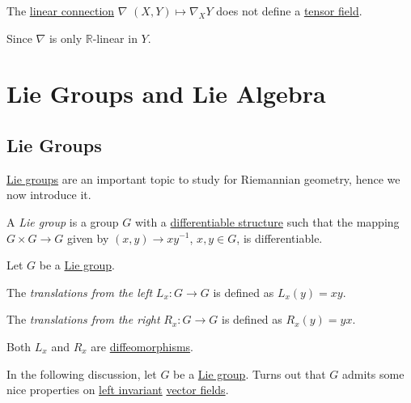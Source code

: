 \begin{eg}
	The \hyperref[def:linear-connection]{linear connection} \(\nabla \) \((X, Y) \mapsto \nabla _X Y\) does not define a \hyperref[def:tensor-field*]{tensor field}.
\end{eg}
\begin{explanation}
	Since \(\nabla \) is only \(\mathbb{R} \)-linear in \(Y\).
\end{explanation}

\section{Lie Groups and Lie Algebra}\label{section:Lie-group-and-Lie-algebra}
\subsection{Lie Groups}
\hyperref[def:Lie-group]{Lie groups} are an important topic to study for Riemannian geometry, hence we now introduce it.

\begin{definition}\label{def:Lie-group}
	A \emph{Lie group} is a group \(G\) with a \hyperref[def:smooth-structure]{differentiable structure} such that the mapping \(G \times G \to G\) given by \((x, y) \to xy^{-1} \), \(x, y\in G\), is differentiable.
\end{definition}

\begin{definition*}[Transformation]
	Let \(G\) be a \hyperref[def:Lie-group]{Lie group}.
	\begin{definition}\label{def:left-transformation}
		The \emph{translations from the left} \(L_x \colon G \to G\) is defined as \(L_x(y) = xy\).
	\end{definition}
	\begin{definition}\label{def:right-transformation}
		The \emph{translations from the right} \(R_x \colon G \to G\) is defined as \(R_x(y) = yx\).
	\end{definition}
\end{definition*}

\begin{remark}
	Both \(L_x\) and \(R_x\) are \hyperref[def:diffeomorphism]{diffeomorphisms}.
\end{remark}

In the following discussion, let \(G\) be a \hyperref[def:Lie-group]{Lie group}. Turns out that \(G\) admits some nice properties on \hyperref[def:vector-field-left-invariant]{left invariant} \hyperref[def:vector-field]{vector fields}.

